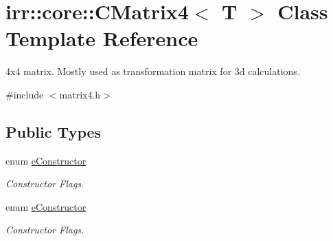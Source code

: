 \hypertarget{classirr_1_1core_1_1CMatrix4}{}\section{irr\+:\+:core\+:\+:C\+Matrix4$<$ T $>$ Class Template Reference}
\label{classirr_1_1core_1_1CMatrix4}


4x4 matrix. Mostly used as transformation matrix for 3d calculations.  




{\ttfamily \#include $<$matrix4.\+h$>$}

\subsection*{Public Types}
\begin{DoxyCompactItemize}
\item 
\mbox{\label{classirr_1_1core_1_1CMatrix4_a7bb79712227617f706ed57a34f3eb4fe}} 
enum \hyperlink{classirr_1_1core_1_1CMatrix4_a7bb79712227617f706ed57a34f3eb4fe}{e\+Constructor} \begin{DoxyCompactList}\small\item\em Constructor Flags. \end{DoxyCompactList}
\item 
\mbox{\label{classirr_1_1core_1_1CMatrix4_a7bb79712227617f706ed57a34f3eb4fe}} 
enum \hyperlink{classirr_1_1core_1_1CMatrix4_a7bb79712227617f706ed57a34f3eb4fe}{e\+Constructor} \begin{DoxyCompactList}\small\item\em Constructor Flags. \end{DoxyCompactList}
\end{DoxyCompactItemize}
